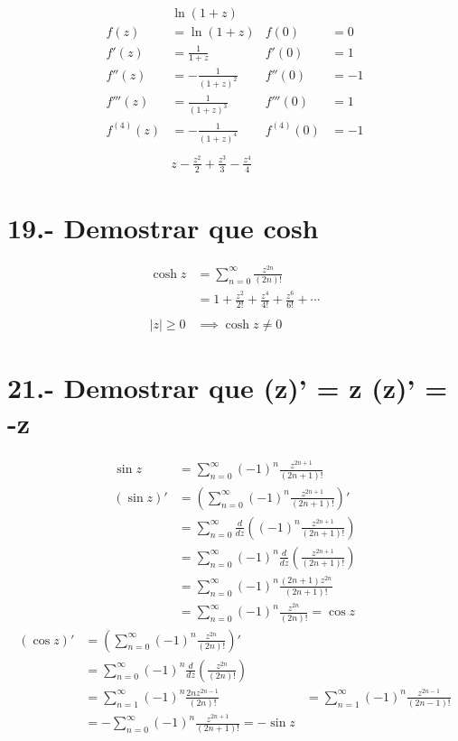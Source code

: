 \documentclass{article}
\begin{document}
\begin{align*}
& \ln(1+z) & \\
f(z) &= \ln(1+z) & f(0) &= 0 \\
f'(z) &= \frac{1}{1+z} & f'(0) &= 1 \\
f''(z) &= -\frac{1}{(1+z)^2} & f''(0) &= -1 \\
f'''(z) &= \frac{1}{(1+z)^3} & f'''(0) &= 1 \\
f^{(4)}(z) &= -\frac{1}{(1+z)^4} & f^{(4)}(0) &= -1 \\
\\
& z - \frac{z^2}{2} + \frac{z^3}{3} - \frac{z^4}{4} 
\end{align*}
\section*{19.- Demostrar que cosh    }
\begin{align*}
\cosh z &= \sum_{n=0}^{\infty} \frac{z^{2n}}{(2n)!} \\
&= 1 + \frac{z^2}{2!} + \frac{z^4}{4!} + \frac{z^6}{6!} + \dotsb \\
\\
|z| \geq 0 &\implies \cosh z \neq 0 
\end{align*}
\section*{21.- Demostrar que  (\sin z)' = \cos z  (\cos z)' = -\sin z}
\begin{align*}
\sin z &= \sum_{n=0}^{\infty} (-1)^n \frac{z^{2n+1}}{(2n+1)!} \\
(\sin z)' &= \left( \sum_{n=0}^{\infty} (-1)^n \frac{z^{2n+1}}{(2n+1)!} \right)' \\
&= \sum_{n=0}^{\infty} \frac{d}{dz} \left( (-1)^n \frac{z^{2n+1}}{(2n+1)!} \right) \\
&= \sum_{n=0}^{\infty} (-1)^n \frac{d}{dz} \left( \frac{z^{2n+1}}{(2n+1)!} \right) \\
&= \sum_{n=0}^{\infty} (-1)^n \frac{(2n+1) z^{2n}}{(2n+1)!} \\
&= \sum_{n=0}^{\infty} (-1)^n \frac{z^{2n}}{(2n)!} = \cos z
\end{align*}
\begin{align*}
(\cos z)' &= \left( \sum_{n=0}^{\infty} (-1)^n \frac{z^{2n}}{(2n)!} \right)' \\
&= \sum_{n=0}^{\infty} (-1)^n \frac{d}{dz} \left( \frac{z^{2n}}{(2n)!} \right) \\
&= \sum_{n=1}^{\infty} (-1)^n \frac{2n z^{2n-1}}{(2n)!}
&= \sum_{n=1}^{\infty} (-1)^n \frac{z^{2n-1}}{(2n-1)!} \\
&= -\sum_{n=0}^{\infty} (-1)^n \frac{z^{2n+1}}{(2n+1)!} = -\sin z 
\end{align*}
\end{document}
